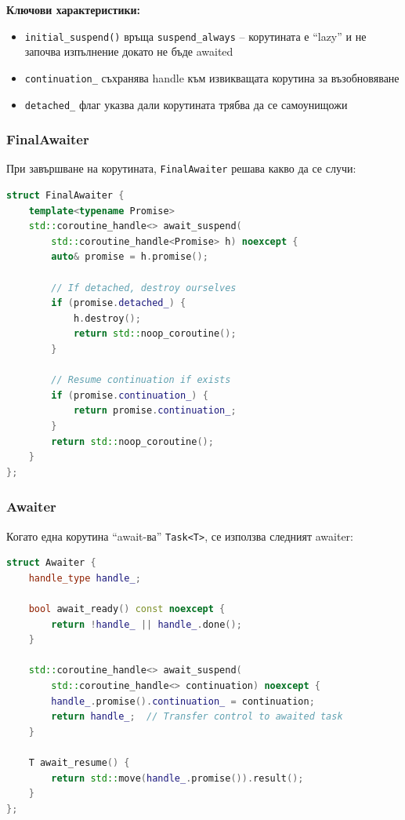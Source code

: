 \textbf{Ключови характеристики:}
\begin{itemize}
    \item \texttt{initial\_suspend()} връща \texttt{suspend\_always} -- корутината е ``lazy'' и не започва изпълнение докато не бъде awaited
    \item \texttt{continuation\_} съхранява handle към извикващата корутина за възобновяване
    \item \texttt{detached\_} флаг указва дали корутината трябва да се самоунищожи
\end{itemize}

\subsubsection{FinalAwaiter}

При завършване на корутината, \texttt{FinalAwaiter} решава какво да се случи:

\begin{lstlisting}[language=C++, basicstyle=\small\ttfamily, caption={FinalAwaiter логика}]
struct FinalAwaiter {
    template<typename Promise>
    std::coroutine_handle<> await_suspend(
        std::coroutine_handle<Promise> h) noexcept {
        auto& promise = h.promise();
        
        // If detached, destroy ourselves
        if (promise.detached_) {
            h.destroy();
            return std::noop_coroutine();
        }
        
        // Resume continuation if exists
        if (promise.continuation_) {
            return promise.continuation_;
        }
        return std::noop_coroutine();
    }
};
\end{lstlisting}

\subsubsection{Awaiter}

Когато една корутина ``await-ва'' \texttt{Task<T>}, се използва следният awaiter:

\begin{lstlisting}[language=C++, basicstyle=\small\ttfamily, caption={Task Awaiter}]
struct Awaiter {
    handle_type handle_;

    bool await_ready() const noexcept {
        return !handle_ || handle_.done();
    }

    std::coroutine_handle<> await_suspend(
        std::coroutine_handle<> continuation) noexcept {
        handle_.promise().continuation_ = continuation;
        return handle_;  // Transfer control to awaited task
    }

    T await_resume() {
        return std::move(handle_.promise()).result();
    }
};
\end{lstlisting}

